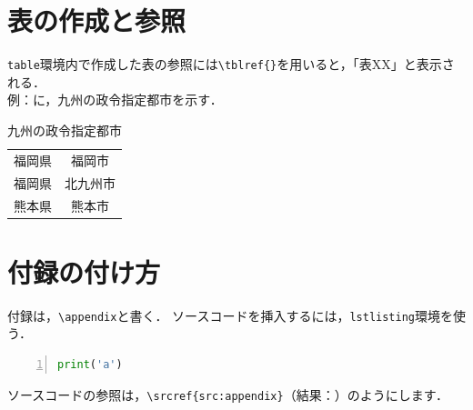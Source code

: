 \documentclass[dvipdfmx]{exp_report}
\begin{document}
\section{表の作成と参照}
\verb|table|環境内で作成した表の参照には\verb|\tblref{}|を用いると，「表XX」と表示される．\\
例：に，九州の政令指定都市を示す．
\begin{table}[h]
    \centering
    \caption{九州の政令指定都市}
    \label{tbl:九州の政令指定都市}
    \begin{tabular}{cc}
        \hline
        福岡県 & 福岡市  \\
        福岡県 & 北九州市 \\
        熊本県 & 熊本市  \\
        \hline
    \end{tabular}
\end{table}
\appendix %
\section{付録の付け方}
付録は，\verb|\appendix|と書く．
ソースコードを挿入するには，\verb|lstlisting|環境を使う．
\begin{lstlisting}[caption={付録です},language={python},label={src:appendix},frame={single},basicstyle={\ttfamily},numbers={left}]
print('a')
\end{lstlisting}
ソースコードの参照は，\verb|\srcref{src:appendix}|（結果：）のようにします．
\end{document}
